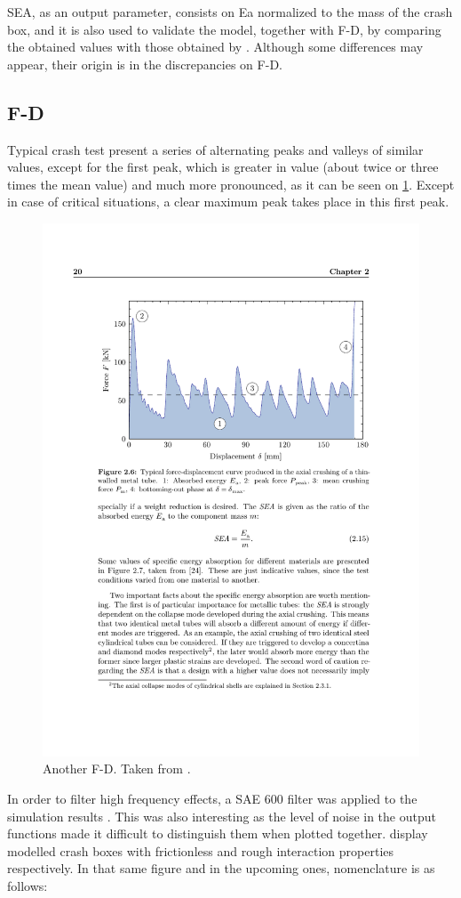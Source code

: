 \documentclass[
documentsize = a4, %
font = cmr, %
typesize = 11, %
printmode = true,
onehalfspacing = true,
language = en, %
titlepage = udciccp, %
degree = pt, %
dedication = true,
acknowledgements = true,
abstract-en = true,
abstract-es = false,
abstract-ga = false,
epigraphs = true,
toc = true,
lof = true,
lot = true,
frontmatterintoc = false,
notation = false,
minimal = false,
]{UDCthesis}
\begin{document}
\Acrfull{SEA}, as an output parameter, consists on \gls{Ea} normalized to the mass of the crash box, and it is also used to validate the model, together with \acrfull{F-D}, by comparing the obtained values with those obtained by \citet{Peroni2009}. Although some differences may appear, their origin is in the discrepancies on \gls{F-D}.

\subsection{\Acrlong{F-D}}
\label{sec:F-D}

Typical crash test  present a series of alternating peaks and valleys of similar values, except for the first peak, which is greater in value (about twice or three times the mean value) and much more pronounced, as it can be seen on \cref{fig:phdcostas_f-d}. Except in case of critical situations, a clear maximum peak takes place in this first peak.

\begin{figure}
\centering
\includegraphics[width=0.7\linewidth]{./IMG_CUTRES/phdcostas_f-d}
\caption[Another \acrlong{F-D}.]{Another \acrlong{F-D}. Taken from \citet{phdCostas}.}
\label{fig:phdcostas_f-d}
\end{figure}

In order to filter high frequency effects, a SAE 600 filter was applied to the simulation results \citep{Huang}. This was also interesting as the level of noise in the output functions made it difficult to distinguish them when plotted together.  display modelled crash boxes with frictionless and rough interaction properties respectively. In that same figure and in the upcoming ones, nomenclature is as follows:
\end{document}

